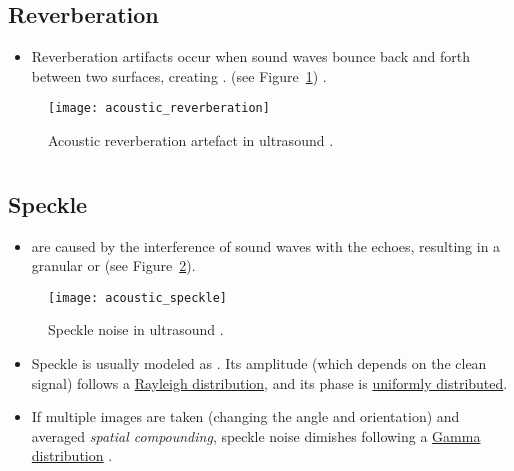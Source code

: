 \subsection{Reverberation}
\begin{itemize}
\item Reverberation artifacts occur when sound waves bounce back and
  forth between two surfaces, creating . (see
  Figure~\ref{fig:acoustic_reverberation}) \cite{NysoraArtifacts}.
\end{itemize}
\vspace{-4ex}
\begin{figure}[!h]
  \centering
  \texttt{[image: acoustic\_reverberation]}
  \caption{Acoustic reverberation artefact in ultrasound
    \cite{NysoraArtifacts}.\label{fig:acoustic_reverberation}}
\end{figure}

\section*{}
\subsection{Speckle}
\begin{itemize}
\item {} are
  caused by the interference of sound waves with the echoes, resulting
  in a granular or   \cite{NysoraArtifacts} (see
  Figure~\ref{fig:acoustic_speckle}).
\end{itemize}
\vspace{-3ex}
\begin{figure}[!h]
  \centering
  \texttt{[image: acoustic\_speckle]}
  \caption{Speckle noise in ultrasound
    \cite{LIASIS2008427}.\label{fig:acoustic_speckle}}
\end{figure}

\begin{itemize}
\item Speckle is usually modeled as . Its amplitude (which depends on the clean
  signal) follows a
  \href{https://en.wikipedia.org/wiki/Rayleigh_distribution}{Rayleigh
    distribution}, and its phase is
  \href{https://en.wikipedia.org/wiki/Discrete_uniform_distribution}{uniformly
    distributed}.

\item If multiple images are taken (changing the angle and
  orientation) and averaged \emph{spatial compounding}, speckle noise
  dimishes following a
  \href{https://en.wikipedia.org/wiki/Gamma_distribution}{Gamma
    distribution} \cite{bushberg2011essential}.
\end{itemize}